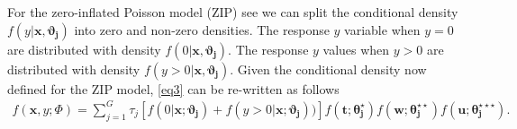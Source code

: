 \documentclass[11pt,letterpaper]{article}
\numberwithin{equation}{section}
\numberwithin{equation}{section}
\numberwithin{equation}{section}
\begin{document}
For the zero-inflated Poisson model (ZIP) see \cite{Lambert} we can split the conditional density $f(y|\bm{x},\bm{\vartheta_j})$ into zero and non-zero densities. %
The response $y$ variable when $y= 0$  are distributed with density $f(0|\bm{x},\bm{\vartheta_{j}})$. The response $y$ values when $y > 0$ are distributed with density $f(y > 0|\bm{x}, \bm{\vartheta_{j}} )$. Given the conditional density now defined for the ZIP model, \eqref{eq3}   
can be re-written as follows 
 \begin{align}
 f(\bm x, y; \Phi)= \sum_{j=1}^{G} \tau_j \left[ f(0|\bm{x};\bm{\vartheta_{j} }) +  f(y > 0|\bm{x} ; \bm{\vartheta_{j}})  ) \right]   f(\bm{t};\bm{\theta_j^{\star}})f(\bm{w};\bm{\theta_j^{\star\star}})f(\bm{u};\bm{\theta_j^{\star\star\star}}). 
\end{align}
\end{document}
